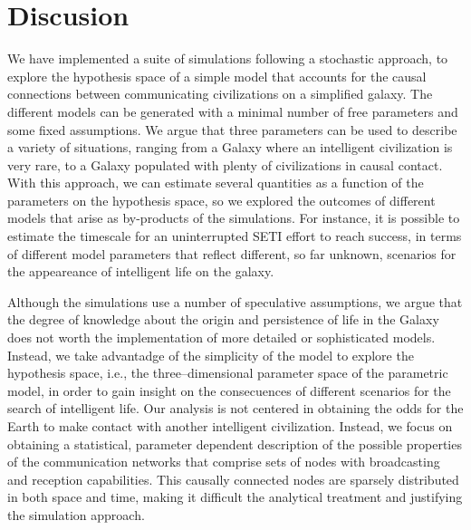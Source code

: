 \documentclass[crop]{CSLB}
\begin{document}
                      




\section{Discusion}\label{S_discussion}

We have implemented a suite of simulations following a stochastic
approach, to explore the hypothesis space of a simple model that
accounts for the causal connections between communicating
civilizations on a simplified galaxy.
%
The different models can be generated with a minimal number of free
parameters and some fixed assumptions.
%
We argue that three parameters can be used to describe a variety of
situations, ranging from a Galaxy where an intelligent civilization is
very rare, to a Galaxy populated with plenty of civilizations in
causal contact.
%
With this approach, we can estimate several quantities as a function
of the parameters on the hypothesis space,
so we explored the outcomes of different models 
that arise as by-products of the simulations.
%
For instance, it is possible to estimate the timescale for an
uninterrupted SETI effort to reach success, in terms of different
model parameters that reflect different, so far unknown, scenarios for
the appeareance of intelligent life on the galaxy.






Although the simulations use a number of speculative assumptions, we
argue that the degree of knowledge about the origin and persistence of
life in the Galaxy does not worth the implementation of more detailed
or sophisticated models.
%
Instead, we take advantadge of the simplicity of the model to explore
the hypothesis space, i.e., the three--dimensional parameter space of
the parametric model, in order to gain insight on the consecuences of
different scenarios for the search of intelligent life.
%
Our analysis is not centered in obtaining the odds for the Earth
to make contact with another intelligent civilization.
%
Instead, we focus on obtaining a statistical, parameter dependent
description of the possible properties of the communication networks
that comprise sets of nodes with broadcasting and reception
capabilities.
%
This causally connected nodes are sparsely distributed in both space
and time, making it difficult the analytical treatment and justifying
the simulation approach.
\end{document}

